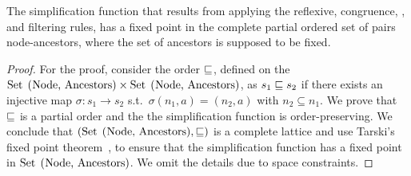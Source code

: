 \begin{theorem}
  \label{thm:fixed_point}
  The simplification function that results from applying the
  reflexive, congruence, \BPA, and filtering rules, has a fixed point
  in the complete partial ordered set of pairs node-ancestors, where
  the set of ancestors is supposed to be fixed.
\end{theorem}
%
\begin{proof}
For the proof, consider the order $\sqsubseteq$, defined on the
  $\text{\lstinline{Set (Node, Ancestors)}} \times
  \text{\lstinline{Set (Node, Ancestors)}}$, as $s_1 \sqsubseteq s_2$ if
  there exists an injective map
  $\sigma : s_1 \rightarrow s_2$ s.t.\ $\sigma(n_1,a) = (n_2,a)$ with
  $n_2\subseteq n_1$. We prove that $\sqsubseteq$ is a partial order and the 
  the simplification function is order-preserving. 
  We conclude that $(\text{\lstinline{Set (Node, Ancestors)}}, \leqSets)$ is
  a complete lattice and use Tarski's fixed point 
  theorem~\cite{tarski1955lattice}, to
  ensure that the simplification function has a fixed point in
  $\text{\lstinline{Set (Node, Ancestors)}}$.
  We omit the details due to space constraints.
\end{proof}





